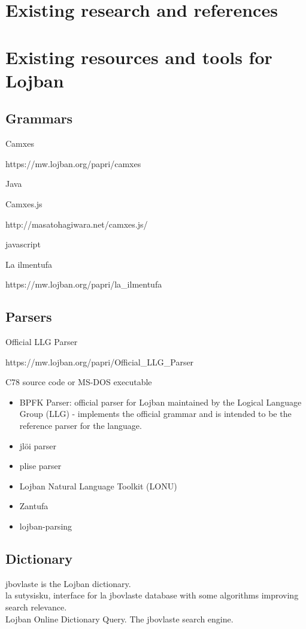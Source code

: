\chapter{Existing research and references}

\chapter{Existing resources and tools for Lojban}

\vspace{0.5cm}

\section{Grammars}

Camxes

https://mw.lojban.org/papri/camxes

Java

Camxes.js

http://masatohagiwara.net/camxes.js/

javascript

La ilmentufa

https://mw.lojban.org/papri/la\_ilmentufa


\section{Parsers}

Official LLG Parser

https://mw.lojban.org/papri/Official\_LLG\_Parser

C78 source code
or
MS-DOS executable

\begin{itemize}
    \item BPFK Parser: official parser for Lojban maintained by the Logical Language Group (LLG) - implements the official grammar and is intended to be the reference parser for the language.
    \item jlöi parser
    \item plise parser
    \item Lojban Natural Language Toolkit (LONU)
    \item Zantufa
    \item lojban-parsing
\end{itemize}

\section{Dictionary}
\label{sec:dictionary}

jbovlaste is the Lojban dictionary. \\

la sutysisku, interface for la jbovlaste database with some algorithms improving search relevance. \\

Lojban Online Dictionary Query. The jbovlaste search engine.\\